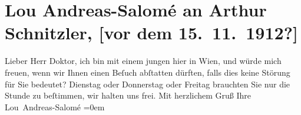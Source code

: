 

         
         \renewcommand{\erwaehntePersonen}{Personen: Ellen Delp}
         \renewcommand{\erwaehnteOrte}{Orte: Wien}
         \renewcommand{\erwaehnteWerke}{}
               \section[Lou Andreas-Salomé an Arthur Schnitzler, {[}vor dem 15. 11. 1912?{]}]{ Lou Andreas-Salomé an Arthur Schnitzler, {[}vor dem
               15. 11. 1912?{]}}\nopagebreak{}\rehead{ }\begin{ledgroupsized}[t]{13cm}\normalsize\beginnumbering \toendnotes[C]{\smallbreak\pagebreak[2]} 
\toendnotes[C]{\smallbreak}\pstart{}{\pb}Lieber Herr Doktor,\pend\pstart
           ich bin mit einem jungen \label{K_L02097_1v}\label{K_L02097_1h} hier
               in Wien, und würde mich freuen, wenn wir Ihnen
               einen Beſuch abſtatten dürften, falls dies keine Störung für Sie bedeutet?
                  Dienstag oder Donnerstag oder Freitag
               brauchten Sie nur die Stunde zu beſtimmen, wir halten uns frei.\pend
           \pstart
           Mit herzlichem Gruß Ihre{\\[\baselineskip]}\spacefill\mbox{Lou Andreas-Salomé}\pend
           \leftskip=0em{}
         
         \endnumbering{}\end{ledgroupsized}  \newcommand{\dateiname}{L02097}\newcommand{\titel}{Lou Andreas-Salomé an Arthur Schnitzler, [vor dem 15. 11. 1912?]}\newcommand{\editorInnen}{Martin Anton Müller und Gerd-Hermann Susen}
      